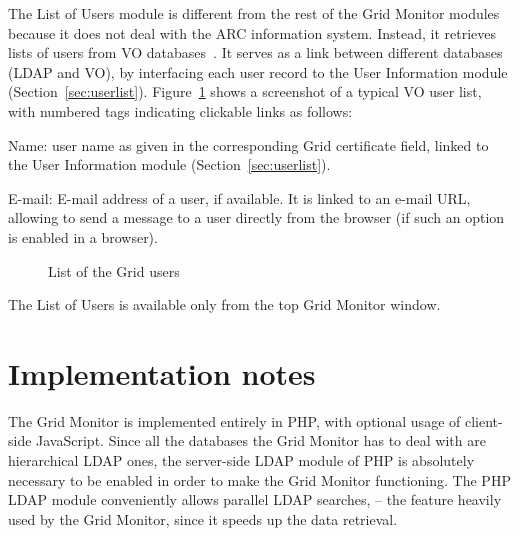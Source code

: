 \documentclass{article}
\begin{document}
The List of Users  module is different from the rest
of the Grid Monitor modules because it does not deal with the
ARC information system. Instead, it retrieves lists of users from
VO databases~\cite{vo}. It serves as a link between different databases
(LDAP and VO), by interfacing each user record to the User Information
module (Section~\ref{sec:userlist}). Figure~\ref{fig:vo-users} shows a
screenshot of a typical VO user list, with numbered tags indicating
clickable links as follows: 
\begin{list}{)}{ \itemsep=-0.5mm}
\item \textsf{Name}: user name as given in the corresponding Grid
  certificate field, linked to the User Information module
  (Section~\ref{sec:userlist}).
\item \textsf{E-mail}: E-mail  address of a user, if
  available. It is linked to an e-mail URL, allowing to send a message
  to a user directly from the browser (if such an option is enabled in
  a browser).
\end{list}

\begin{figure}[ht]
  \caption{\label{fig:vo-users}List of the Grid users}
\end{figure}

The List of Users is available only from the top Grid Monitor window.

\section{Implementation notes}
\label{sec:implement}

The Grid Monitor is implemented entirely in PHP, with optional usage
of client-side JavaScript. Since all the databases the Grid Monitor
has to deal with are hierarchical LDAP ones, the server-side LDAP
module of PHP is absolutely necessary to be enabled in order to make
the Grid Monitor functioning. The PHP LDAP module conveniently allows
parallel LDAP searches, -- the feature heavily used by the Grid
Monitor, since it speeds up the data retrieval.
\end{document}
